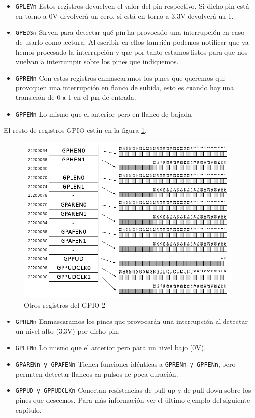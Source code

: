 \begin{itemize}
  \item {\tt GPLEVn} Estos registros devuelven el valor del pin respectivo. Si dicho pin está
        en torno a 0V devolverá un cero, si está en torno a 3.3V devolverá un 1.
  \item {\tt GPEDSn} Sirven para detectar qué pin ha provocado una interrupción en caso de
        usarlo como lectura. Al escribir en ellos también podemos notificar que ya hemos procesado
        la interrupción y que por tanto estamos listos para que nos vuelvan a interrumpir sobre
        los pines que indiquemos.
  \item {\tt GPRENn} Con estos registros enmascaramos los pines que queremos que provoquen una
        interrupción en flanco de subida, esto es cuando hay una transición de 0 a 1 en el pin
        de entrada.
  \item {\tt GPFENn} Lo mismo que el anterior pero en flanco de bajada.
\end{itemize}

El resto de registros GPIO están en la figura \ref{fig:gpio3}.

\begin{figure}[h]
  \centering
    \includegraphics[width=14cm]{graphs/gpio3.png}
  \caption{Otros registros del GPIO 2}
  \label{fig:gpio3}
\end{figure}

\begin{itemize}
  \item {\tt GPHENn} Enmascaramos los pines que provocarán una interrupción al detectar un
        nivel alto (3.3V) por dicho pin.
  \item {\tt GPLENn} Lo mismo que el anterior pero para un nivel bajo (0V).
  \item {\tt GPARENn y GPAFENn} Tienen funciones idénticas a {\tt GPRENn y GPFENn}, pero permiten
        detectar flancos en pulsos de poca duración.
  \item {\tt GPPUD y GPPUDCLKn} Conectan resistencias de pull-up y de pull-down sobre los pines
        que deseemos. Para más información ver el último ejemplo del siguiente capítulo.
\end{itemize}

